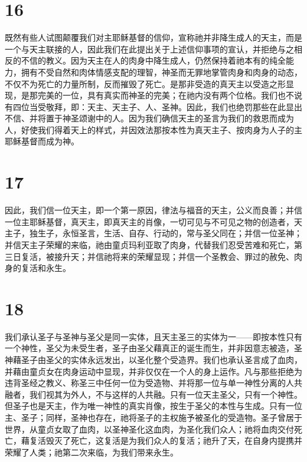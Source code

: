 
\section{16}

既然有些人试图颠覆我们对主耶稣基督的信仰，宣称祂并非降生成人的天主，而是一个与天主联接的人，因此我们在此提出关于上述信仰事项的宣认，并拒绝与之相反的不信的教义。因为天主在人的肉身中降生成人，仍然保持着祂本有的纯全能力，拥有不受自然和肉体情感支配的理智，神圣而无罪地掌管肉身和肉身的动态，不仅不为死亡的力量所制，反而摧毁了死亡。是那非受造的真天主以受造之形显现，是那完美的一位，具有真实而神圣的完美；在祂内没有两个位格。我们也不说有四位当受敬拜，即：天主、天主子、人、圣神。因此，我们也绝罚那些在此显出不信、并将置于神圣颂谢中的人。因为我们确信天主的圣言为我们的救恩而成为人，好使我们得着天上的样式，并因效法那按本性为真天主子、按肉身为人子的主耶稣基督而成为神。\par


\section{17}

因此，我们信一位天主，即一个第一原因，律法与福音的天主，公义而良善；并信一位主耶稣基督，真天主，即真天主的肖像，一切可见与不可见之物的创造者，天主子，独生子，永恒圣言，生活、自存、行动的，常与圣父同在；并信一位圣神；并信天主子荣耀的来临，祂由童贞玛利亚取了肉身，代替我们忍受苦难和死亡，第三日复活，被接升天；并信祂将来的荣耀显现；并信一个圣教会、罪过的赦免、肉身的复活和永生。\par


\section{18}

我们承认圣子与圣神与圣父是同一实体，且天主圣三的实体为一——即按本性只有一个神性，圣父为未受生者，圣子由圣父藉真正的诞生而生，并非因意志被造，圣神藉圣子由圣父的实体永远发出，以圣化整个受造界。我们也承认圣言成了血肉，并藉由童贞女在肉身运动中显现，并非仅仅在一个人的身上运作。凡与那些拒绝为违背圣经之教义、称圣三中任何一位为受造物、并将那一位与单一神性分离的人共融者，我们视其为外人，不与这样的人共融。只有一位天主圣父，只有一个神性。但圣子也是天主，作为唯一神性的真实肖像，按生于圣父的本性与生成。只有一位主、圣子；同样，圣神也存在，祂将圣子的主权施予被圣化的受造物。圣子曾居于世界，从童贞女取了血肉，以圣神圣化这血肉，为圣化我们众人；祂将血肉交付死亡，藉复活毁灭了死亡，这复活是为我们众人的复活；祂升了天，在自身内提携并荣耀了人类；祂第二次来临，为我们带来永生。\par

